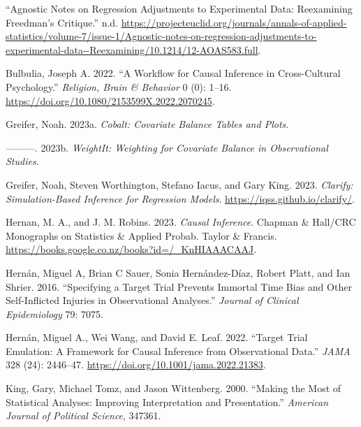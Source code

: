 \documentclass[
  singlecolumn]{report}
\newlength{\cslhangindent}
\newlength{\cslentryspacingunit} %
\newenvironment{CSLReferences}[2] %
 {%
  \setlength{\parindent}{0pt}
  \ifodd #1
  \let\oldpar\par
  \def\par{\hangindent=\cslhangindent\oldpar}
  \fi
  \setlength{\parskip}{#2\cslentryspacingunit}
 }%
 {}
\begin{document}
\hypertarget{refs}{}
\begin{CSLReferences}{1}{0}
\leavevmode{}%
{``Agnostic Notes on Regression Adjustments to Experimental Data:
Reexamining Freedman{'}s Critique.''} n.d.
\url{https://projecteuclid.org/journals/annals-of-applied-statistics/volume-7/issue-1/Agnostic-notes-on-regression-adjustments-to-experimental-data--Reexamining/10.1214/12-AOAS583.full}.

\leavevmode{}%
Bulbulia, Joseph A. 2022. {``A Workflow for Causal Inference in
Cross-Cultural Psychology.''} \emph{Religion, Brain \& Behavior} 0 (0):
1--16. \url{https://doi.org/10.1080/2153599X.2022.2070245}.

\leavevmode{}%
Greifer, Noah. 2023a. \emph{Cobalt: Covariate Balance Tables and Plots}.

\leavevmode{}%
---------. 2023b. \emph{WeightIt: Weighting for Covariate Balance in
Observational Studies}.

\leavevmode{}%
Greifer, Noah, Steven Worthington, Stefano Iacus, and Gary King. 2023.
\emph{Clarify: Simulation-Based Inference for Regression Models}.
\url{https://iqss.github.io/clarify/}.

\leavevmode{}%
Hernan, M. A., and J. M. Robins. 2023. \emph{Causal Inference}. Chapman
\& Hall/CRC Monographs on Statistics \& Applied Probab. Taylor \&
Francis. \url{https://books.google.co.nz/books?id=/_KnHIAAACAAJ}.

\leavevmode{}%
Hernán, Miguel A, Brian C Sauer, Sonia Hernández-Díaz, Robert Platt, and
Ian Shrier. 2016. {``Specifying a Target Trial Prevents Immortal Time
Bias and Other Self-Inflicted Injuries in Observational Analyses.''}
\emph{Journal of Clinical Epidemiology} 79: 7075.

\leavevmode{}%
Hernán, Miguel A., Wei Wang, and David E. Leaf. 2022. {``Target Trial
Emulation: A Framework for Causal Inference from Observational Data.''}
\emph{JAMA} 328 (24): 2446--47.
\url{https://doi.org/10.1001/jama.2022.21383}.

\leavevmode{}%
King, Gary, Michael Tomz, and Jason Wittenberg. 2000. {``Making the Most
of Statistical Analyses: Improving Interpretation and Presentation.''}
\emph{American Journal of Political Science}, 347361.


\end{CSLReferences}
\end{document}
